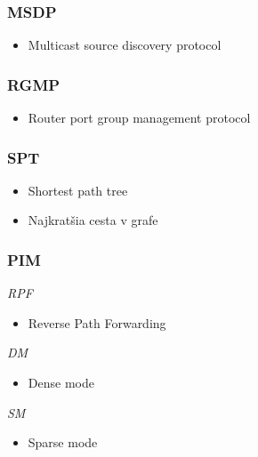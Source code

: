 \documentclass[10pt,xcolor=pdflatex,hyperref={unicode}]{beamer}
\begin{document}
    \begin{frame}
        \frametitle{MSDP}
        \begin{itemize}
            \item Multicast source discovery protocol
        \end{itemize}
    \end{frame}

    \begin{frame}
        \frametitle{RGMP}
        \begin{itemize}
            \item Router port group management protocol
        \end{itemize}
    \end{frame}

    \begin{frame}
        \frametitle{SPT}
        \begin{itemize}
            \item Shortest path tree
            \item Najkratšia cesta v grafe
        \end{itemize}
    \end{frame}

    \begin{frame}
        \frametitle{PIM}
        \emph{RPF}
        \begin{itemize}
            \item Reverse Path Forwarding
        \end{itemize}
        \emph{DM}
        \begin{itemize}
            \item Dense mode
        \end{itemize}
        \emph{SM}
        \begin{itemize}
            \item Sparse mode
        \end{itemize}
    \end{frame}
\end{document}
